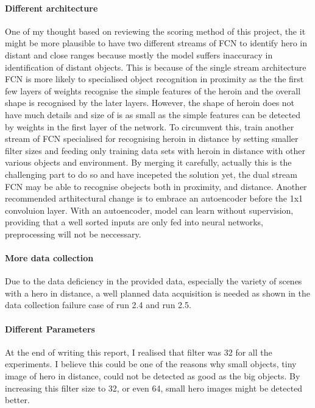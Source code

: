\documentclass[paper=a4, fontsize=11pt]{scrartcl} %
\numberwithin{equation}{section} %
\numberwithin{figure}{section} %
\numberwithin{table}{section} %
\begin{document}
\paragraph{Different architecture}
One of my thought based on reviewing the scoring method of this project, the it might be more plausible to have two different streams of FCN to identify hero in distant and close ranges because mostly the model suffers inaccuracy in identification of distant objects. This is because of the single stream architecture FCN is more likely to specialised object recognition in proximity as the the first few layers of weights recognise the simple features of the heroin and the overall shape is recognised by the later layers. However, the shape of heroin does not have much details and size of is as small as the simple features can be detected by weights in the first layer of the network. To circumvent this, train another stream of FCN specialised for recognising heroin in distance by setting smaller filter sizes and feeding only training data sets with heroin in distance with other various objects and environment. By merging it carefully, actually this is the challenging part to do so and have incepeted the solution yet, the dual stream FCN may be able to recognise obejects both in proximity, and distance.
Another recommended arthitectural change is to embrace an autoencoder before the 1x1 convoluion layer. With an autoencoder, model can learn without supervision, providing that a well sorted inputs are only fed into neural networks, preprocessing will not be neccessary.
\paragraph{More data collection}
Due to the data deficiency in the provided data, especially the variety of scenes with a hero in distance, a well planned data acquisition is needed as shown in the data collection failure case of run 2.4 and run 2.5. 
\paragraph{Different Parameters}
At the end of writing this report, I realised that filter was 32 for all the experiments. I believe this could be one of the reasons why small objects, tiny image of hero in distance, could not be detected as good as the big objects. By increasing this filter size to 32, or even 64, small hero images might be detected better.
\pagebreak
\end{document}
